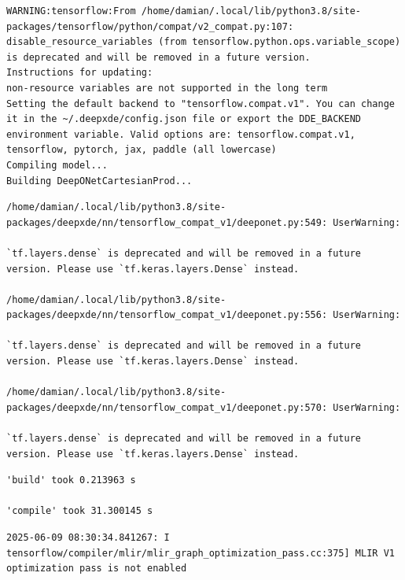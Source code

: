 \documentclass[
  spanish,
  us-letterpaper,
  DIV=11,
  numbers=noendperiod]{scrreprt}
\theoremstyle{definition}
\theoremstyle{plain}
\theoremstyle{remark}
\begin{document}
\begin{verbatim}
WARNING:tensorflow:From /home/damian/.local/lib/python3.8/site-packages/tensorflow/python/compat/v2_compat.py:107: disable_resource_variables (from tensorflow.python.ops.variable_scope) is deprecated and will be removed in a future version.
Instructions for updating:
non-resource variables are not supported in the long term
Setting the default backend to "tensorflow.compat.v1". You can change it in the ~/.deepxde/config.json file or export the DDE_BACKEND environment variable. Valid options are: tensorflow.compat.v1, tensorflow, pytorch, jax, paddle (all lowercase)
Compiling model...
Building DeepONetCartesianProd...
\end{verbatim}

\begin{verbatim}
/home/damian/.local/lib/python3.8/site-packages/deepxde/nn/tensorflow_compat_v1/deeponet.py:549: UserWarning:

`tf.layers.dense` is deprecated and will be removed in a future version. Please use `tf.keras.layers.Dense` instead.

/home/damian/.local/lib/python3.8/site-packages/deepxde/nn/tensorflow_compat_v1/deeponet.py:556: UserWarning:

`tf.layers.dense` is deprecated and will be removed in a future version. Please use `tf.keras.layers.Dense` instead.

/home/damian/.local/lib/python3.8/site-packages/deepxde/nn/tensorflow_compat_v1/deeponet.py:570: UserWarning:

`tf.layers.dense` is deprecated and will be removed in a future version. Please use `tf.keras.layers.Dense` instead.
\end{verbatim}

\begin{verbatim}
'build' took 0.213963 s

'compile' took 31.300145 s
\end{verbatim}

\begin{verbatim}
2025-06-09 08:30:34.841267: I tensorflow/compiler/mlir/mlir_graph_optimization_pass.cc:375] MLIR V1 optimization pass is not enabled
\end{verbatim}
\end{document}

